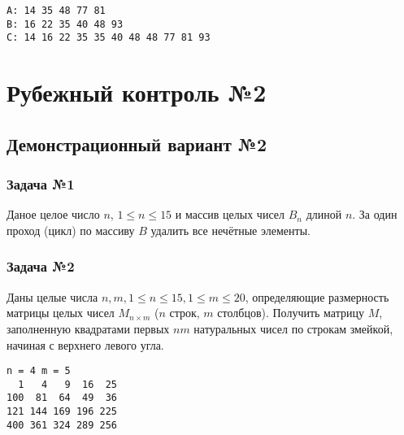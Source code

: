 \documentclass[12pt,a5paper,landscape]{article}
\begin{document}
\begin{lstlisting}[caption={}]
A: 14 35 48 77 81
B: 16 22 35 40 48 93
C: 14 16 22 35 35 40 48 48 77 81 93
\end{lstlisting}

\clearpage
\section*{Рубежный контроль №2}
\subsection*{Демонстрационный вариант №2}
\subsubsection*{Задача №1}
Даное целое число $n$, $1 \le n \le 15$ и массив целых чисел $B_{n}$ длиной $n$. За один проход (цикл) по массиву $B$ удалить все нечётные элементы.
\subsubsection*{Задача №2}
Даны целые числа $n, m, 1 \le n \le 15, 1 \le m \le 20$, определяющие размерность матрицы целых чисел $M_{n \times m}$ ($n$ строк, $m$ столбцов). Получить матрицу $M$, заполненную квадратами первых $nm$ натуральных чисел по строкам змейкой, начиная с верхнего левого угла.
\begin{lstlisting}[caption={}]
n = 4 m = 5
  1   4   9  16  25
100  81  64  49  36
121 144 169 196 225
400 361 324 289 256
\end{lstlisting}
\end{document}
